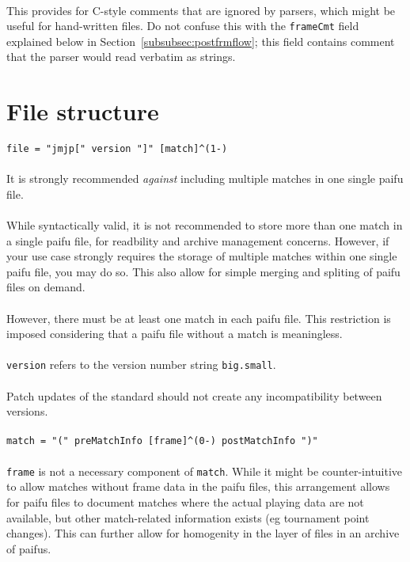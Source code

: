 \documentclass[%
	a4paper%
	,10pt%
	,twoside%
	,notitlepage%
]{article}%
\newcommand*{\ruleSymbol}{\textjapanese{⚠}}%
\newcommand*{\ruleMargin}{\marginpar{\flushright{}\ruleSymbol{}}}%
\newcommand*{\rulePar}{\paragraph*{\ruleMargin{}}}%
\begin{document}
		\paragraph*{}This provides for C-style comments that are ignored by parsers, which might be useful for hand-written files. Do not confuse this with the \lstinline/frameCmt/ field explained below in Section~\ref{subsubsec:postfrmflow}; this field contains comment that the parser would read verbatim as strings. %
\section{File structure}\label{sec:filestruct}%
% 
	\rulePar{}\lstinline/file = "jmjp[" version "]" [match]^(1-)/%
	\rulePar{}It is strongly recommended \textit{against} including multiple matches in one single paifu file. %
	\paragraph*{}While syntactically valid, it is not recommended to store more than one match in a single paifu file, for readbility and archive management concerns. However, if your use case strongly requires the storage of multiple matches within one single paifu file, you may do so. This also allow for simple merging and spliting of paifu files on demand. %
	\paragraph*{}However, there must be at least one match in each paifu file. This restriction is imposed considering that a paifu file without a match is meaningless. %
	\rulePar{}\lstinline/version/ refers to the version number string \texttt{big.small}. %
	\rulePar{}Patch updates of the standard should not create any incompatibility between versions. %
	\rulePar{}\lstinline/match = "(" preMatchInfo [frame]^(0-) postMatchInfo ")"/%
	\paragraph*{}\lstinline/frame/ is not a necessary component of \lstinline/match/. While it might be counter-intuitive to allow matches without frame data in the paifu files, this arrangement allows for paifu files to document matches where the actual playing data are not available, but other match-related information exists (eg tournament point changes). This can further allow for homogenity in the layer of files in an archive of paifus. %
\end{document}
